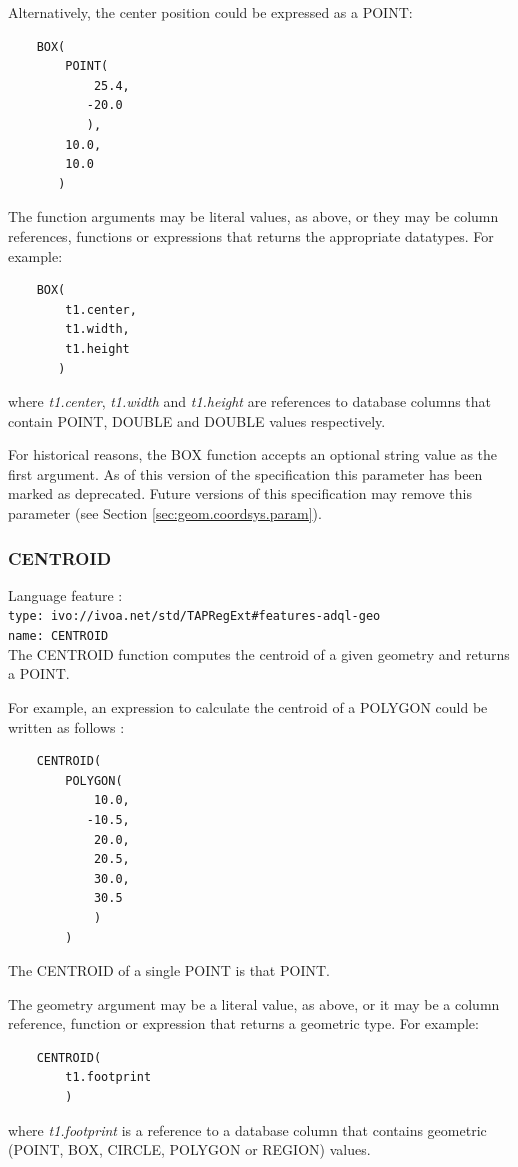 \documentclass[11pt,a4paper]{ivoa}
\newcommand{\SectionSee}[1]{(see Section \ref{#1})\xspace}
\begin{document}
Alternatively, the center position could be expressed as a POINT:
\begin{verbatim}
    BOX(
        POINT(
            25.4,
           -20.0
           ),
        10.0,
        10.0
       )
\end{verbatim}

The function arguments may be literal values, as above, or they may be
column references, functions or expressions that returns the appropriate
datatypes.
For example:
\begin{verbatim}
    BOX(
        t1.center,
        t1.width,
        t1.height
       )
\end{verbatim}
where \textit{t1.center}, \textit{t1.width} and \textit{t1.height}
are references to database columns that contain POINT, DOUBLE
and DOUBLE values respectively.

For historical reasons, the BOX function accepts an optional string
value as the first argument.
As of this version of the specification this parameter has been
marked as deprecated.
Future versions of this specification may remove this parameter
\SectionSee{sec:geom.coordsys.param}.

\subsubsection{CENTROID}
\label{sec:functions.geom.centroid}
{\footnotesize Language feature :}\\
{\footnotesize \verb|type: ivo://ivoa.net/std/TAPRegExt#features-adql-geo|}\\
{\footnotesize \verb|name: CENTROID|}\\

The CENTROID function computes the centroid of a given geometry and returns a POINT.

For example, an expression to calculate the centroid of a POLYGON could
be written as follows :
\begin{verbatim}
    CENTROID(
        POLYGON(
            10.0,
           -10.5,
            20.0,
            20.5,
            30.0,
            30.5
            )
        )
\end{verbatim}

The CENTROID of a single POINT is that POINT.

The geometry argument may be a literal value, as above, or it may be a
column reference, function or expression that returns a geometric type.
For example:
\begin{verbatim}
    CENTROID(
        t1.footprint
        )
\end{verbatim}
where \textit{t1.footprint} is a reference to a database column that
contains geometric (POINT, BOX, CIRCLE, POLYGON or REGION) values.
\end{document}
